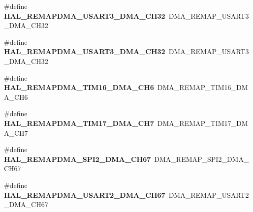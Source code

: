 \begin{DoxyCompactItemize}
\item 
\#define {\bfseries H\+A\+L\+\_\+\+R\+E\+M\+A\+P\+D\+M\+A\+\_\+\+U\+S\+A\+R\+T3\+\_\+\+D\+M\+A\+\_\+\+C\+H32}~D\+M\+A\+\_\+\+R\+E\+M\+A\+P\+\_\+\+U\+S\+A\+R\+T3\+\_\+\+D\+M\+A\+\_\+\+C\+H32\hypertarget{group___h_a_l___d_m_a___aliased___defines_ga79d86fdf916efa7463e359ac4a404e29}{}\label{group___h_a_l___d_m_a___aliased___defines_ga79d86fdf916efa7463e359ac4a404e29}

\item 
\#define {\bfseries H\+A\+L\+\_\+\+R\+E\+M\+A\+P\+D\+M\+A\+\_\+\+U\+S\+A\+R\+T3\+\_\+\+D\+M\+A\+\_\+\+C\+H32}~D\+M\+A\+\_\+\+R\+E\+M\+A\+P\+\_\+\+U\+S\+A\+R\+T3\+\_\+\+D\+M\+A\+\_\+\+C\+H32\hypertarget{group___h_a_l___d_m_a___aliased___defines_ga79d86fdf916efa7463e359ac4a404e29}{}\label{group___h_a_l___d_m_a___aliased___defines_ga79d86fdf916efa7463e359ac4a404e29}

\item 
\#define {\bfseries H\+A\+L\+\_\+\+R\+E\+M\+A\+P\+D\+M\+A\+\_\+\+T\+I\+M16\+\_\+\+D\+M\+A\+\_\+\+C\+H6}~D\+M\+A\+\_\+\+R\+E\+M\+A\+P\+\_\+\+T\+I\+M16\+\_\+\+D\+M\+A\+\_\+\+C\+H6\hypertarget{group___h_a_l___d_m_a___aliased___defines_ga982538686481944a0bb7277321303bee}{}\label{group___h_a_l___d_m_a___aliased___defines_ga982538686481944a0bb7277321303bee}

\item 
\#define {\bfseries H\+A\+L\+\_\+\+R\+E\+M\+A\+P\+D\+M\+A\+\_\+\+T\+I\+M17\+\_\+\+D\+M\+A\+\_\+\+C\+H7}~D\+M\+A\+\_\+\+R\+E\+M\+A\+P\+\_\+\+T\+I\+M17\+\_\+\+D\+M\+A\+\_\+\+C\+H7\hypertarget{group___h_a_l___d_m_a___aliased___defines_ga5ff091f7f81537b41fe4bac1d0f7918b}{}\label{group___h_a_l___d_m_a___aliased___defines_ga5ff091f7f81537b41fe4bac1d0f7918b}

\item 
\#define {\bfseries H\+A\+L\+\_\+\+R\+E\+M\+A\+P\+D\+M\+A\+\_\+\+S\+P\+I2\+\_\+\+D\+M\+A\+\_\+\+C\+H67}~D\+M\+A\+\_\+\+R\+E\+M\+A\+P\+\_\+\+S\+P\+I2\+\_\+\+D\+M\+A\+\_\+\+C\+H67\hypertarget{group___h_a_l___d_m_a___aliased___defines_ga6376d9fb648c5df3bbd41746b98cb986}{}\label{group___h_a_l___d_m_a___aliased___defines_ga6376d9fb648c5df3bbd41746b98cb986}

\item 
\#define {\bfseries H\+A\+L\+\_\+\+R\+E\+M\+A\+P\+D\+M\+A\+\_\+\+U\+S\+A\+R\+T2\+\_\+\+D\+M\+A\+\_\+\+C\+H67}~D\+M\+A\+\_\+\+R\+E\+M\+A\+P\+\_\+\+U\+S\+A\+R\+T2\+\_\+\+D\+M\+A\+\_\+\+C\+H67\hypertarget{group___h_a_l___d_m_a___aliased___defines_gad932cab9ecf9c8d136b8421d8506a270}{}\label{group___h_a_l___d_m_a___aliased___defines_gad932cab9ecf9c8d136b8421d8506a270}


\end{DoxyCompactItemize}

